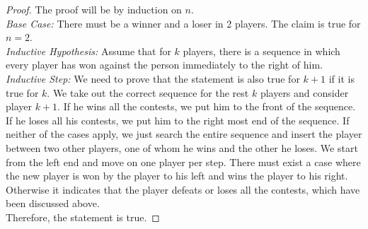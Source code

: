 \documentclass[11pt]{article}
\begin{document}
\begin{Answer}
	\begin{proof}
		The proof will be by induction on $n$.	\\
		\emph{Base Case:} There must be a winner and a loser in 2 players. The claim is true for $n=2$. \\
		\emph{Inductive Hypothesis:} Assume that for $k$ players, there is a sequence in which every player has won against 
		the person immediately to the right of him. \\ 
		\emph{Inductive Step:} We need to prove that the statement is also true for $k+1$ if it is true for $k$. We take out
		the correct sequence for the rest $k$ players and consider player $k+1$. If he wins all the contests, we put him to 
		the front of the sequence. If he loses all his contests, we put him to the right most end of the sequence. If neither
		of the cases apply, we just search the entire sequence and insert the player between two other players, one of whom 
		he wins and the other he loses. We start from the left end and move on one player per step. There must exist a case 
		where the new player is won by the player to his left and wins the player to his right. Otherwise it indicates that 
		the player defeats or loses all the contests, which have been discussed above. \\
		Therefore, the statement is true.
	\end{proof}
\end{Answer}
\end{document}
